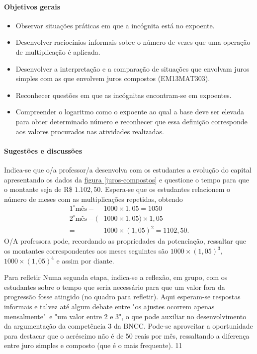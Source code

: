 \def\currentcolor{session1}
\begin{texto}
{
\paragraph{Objetivos gerais}
\begin{itemize}
\item Observar situações práticas em que a incógnita está no expoente.
\item Desenvolver raciocínios informais sobre o número de vezes que uma operação de multiplicação é aplicada.
\item Desenvolver a interpretação e a comparação de situações que envolvam juros simples com as que envolvem juros compostos (EM13MAT303).
\item Reconhecer questões em que as incógnitas encontram-se em expoentes.
\item Compreender o logaritmo como o expoente ao qual a base deve ser elevada para obter determinado número e reconhecer que essa definição corresponde aos valores procurados nas atividades realizadas.
\end{itemize}

\paragraph{Sugestões e discussões}

Indica-se que o/a professor/a desenvolva com os estudantes a evolução  do capital apresentando os dados da \hyperref[juros-compostos]{figura \ref{juros-compostos}} e questione o tempo para que o montante seja de R\$ $1.102{,}50$. Espera-se que os estudantes relacionem o número de meses com as multiplicações repetidas, obtendo
\begin{align*} 
1^{\circ} \mbox{m\^es} - &1000 \times 1,05 = 1050\\
2^{\circ} \mbox{m\^es} - (&1000 \times 1,05) \times 1,05\\
 = &1000 \times (1,05)^2 = 1102,50.
\end{align*}
O/A professora pode, recordando as propriedades da potenciação, ressaltar que os montantes correspondentes aos meses seguintes são 
$1000 \times (1,05)^3$, $1000 \times (1,05)^4$ e assim por diante.
}
\end{texto}
\begin{sugestions}{Para refletir}
{
	Numa segunda etapa, indica-se a reflexão, em grupo, com os estudantes sobre o tempo que seria necessário para que um valor fora da progressão fosse atingido (no quadro para refletir). Aqui esperam-se respostas informais e talvez até algum debate entre "os ajustes ocorrem apenas mensalmente"\, e "um valor entre 2 e 3", o que pode auxiliar no desenvolvimento da argumentação da competência 3 da BNCC. Pode-se aproveitar a oportunidade para destacar que o acréscimo não é de 50 reais por mês, ressaltando a diferença entre juro simples e composto (que é o mais frequente).
}{1}{1}
\end{sugestions}
